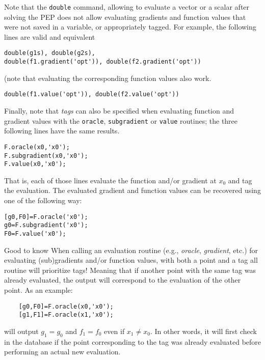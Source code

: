 \documentclass[11pt,a4paper]{article}
\begin{document}
Note that the \verb?double? command, allowing to evaluate a vector or a scalar after solving the PEP does not allow evaluating gradients and function values that were not saved in a variable, or appropriately tagged. For example, the following lines are valid and equivalent\\[-1cm]
\begin{lstlisting}
double(g1s), double(g2s),
double(f1.gradient('opt')), double(f2.gradient('opt'))
\end{lstlisting}
(note that evaluating the corresponding function values also work.\\[-1cm]
\begin{lstlisting}
double(f1.value('opt')), double(f2.value('opt'))
\end{lstlisting}
Finally, note that \emph{tags} can also be specified when evaluating function and gradient values with the \verb?oracle?, \verb?subgradient? or \verb?value? routines; the three following lines have the same results.\\[-1cm]
\begin{lstlisting}
F.oracle(x0,'x0');
F.subgradient(x0,'x0');
F.value(x0,'x0');
\end{lstlisting}
That is, each of those lines evaluate the function and/or gradient at $x_0$ and tag the evaluation. The evaluated gradient and function values can be recovered using one of the  following way:\\[-1cm]
\begin{lstlisting}
[g0,F0]=F.oracle('x0');
g0=F.subgradient('x0');
F0=F.value('x0');
\end{lstlisting}
\begin{bclogo}[logo=\bcattention, couleur=blue!30, arrondi =0.1, sousTitre=Specifying both a tag a a point]{Good to know}
	When calling an evaluation routine (e.g., \emph{oracle}, \emph{gradient}, etc.) for evaluating (sub)gradients and/or function values, with both a point and a tag all routine will prioritize tags! Meaning that if another point with the same tag was already evaluated, the output will correspond to the evaluation of the other point. As an example:\\[-1cm]
	\begin{lstlisting}
	[g0,F0]=F.oracle(x0,'x0');
	[g1,F1]=F.oracle(x1,'x0');
	\end{lstlisting}
	will output $g_1=g_0$ and $f_1=f_0$ even if $x_1\neq x_0$. In other words, it will first check in the database if the point corresponding to the tag was already evaluated before performing an actual new evaluation.
\end{bclogo}
\clearpage
\end{document}
